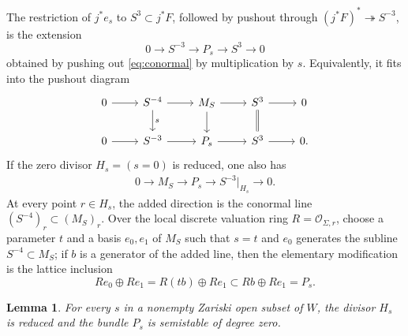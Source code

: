 \documentclass[oneside,11pt]{amsart}
\newtheorem{lem}[thm]{Lemma}
\theoremstyle{definition}
\theoremstyle{remark}
\numberwithin{thm}{section}
\numberwithin{equation}{section}
\begin{document}
The restriction of $j^*e_s$ to $S^3\subset j^*F$, followed by pushout through $(j^*F)^*\twoheadrightarrow S^{-3}$, is the extension
\[
 0\longrightarrow S^{-3}\longrightarrow P_s
 \longrightarrow S^3\longrightarrow0
\]
obtained by pushing out \eqref{eq:conormal} by multiplication by $s$. Equivalently, it fits into the pushout diagram
\[
\begin{tikzcd}
0\arrow[r]&S^{-4}\arrow[r]\arrow[d,"s"]
&M_S\arrow[r]\arrow[d]&S^3\arrow[r]\arrow[d,equal]&0\\
0\arrow[r]&S^{-3}\arrow[r]&P_s\arrow[r]&S^3\arrow[r]&0.
\end{tikzcd}
\]
If the zero divisor $H_s=(s=0)$ is reduced, one also has
\begin{align}\label{eq:elementary-modification}
 0\longrightarrow M_S\longrightarrow P_s
 \longrightarrow S^{-3}|_{H_s}\longrightarrow0.
\end{align}
At every point $r\in H_s$, the added direction is the conormal line $(S^{-4})_r\subset(M_S)_r$.  Over the local discrete valuation ring $R=\mathcal{O}_{\Sigma,r}$, choose a parameter $t$ and a basis $e_0,e_1$ of $M_S$ such that $s=t$ and $e_0$ generates the subline $S^{-4}\subset M_S$; if $b$ is a generator of the added line, then the elementary modification is the lattice inclusion
\[
 Re_0\oplus Re_1
 =R(tb)\oplus Re_1
 \subset Rb\oplus Re_1=P_s.
\]

\begin{lem}\label{lem:good-section}
For every $s$ in a nonempty Zariski open subset of $W$, the divisor $H_s$ is reduced and the bundle $P_s$ is semistable of degree zero.
\end{lem}
\end{document}
